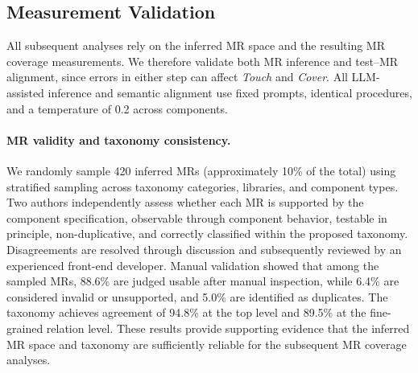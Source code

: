 \subsection{Measurement Validation}\label{sec:validation}
All subsequent analyses rely on the inferred MR space and the resulting MR coverage measurements. We therefore validate both MR inference and test--MR alignment, since errors in either step can affect \textit{Touch} and \textit{Cover}. All LLM-assisted inference and semantic alignment use fixed prompts, identical procedures, and a temperature of 0.2 across components.

\paragraph{MR validity and taxonomy consistency.}
We randomly sample 420 inferred MRs (approximately 10\% of the total) using stratified sampling across taxonomy categories, libraries, and component types. Two authors independently assess whether each MR is supported by the component specification, observable through component behavior, testable in principle, non-duplicative, and correctly classified within the proposed taxonomy. Disagreements are resolved through discussion and subsequently reviewed by an experienced front-end developer. 
Manual validation showed that among the sampled MRs, 88.6\% are judged usable after manual inspection, while 6.4\% are considered invalid or unsupported, and 5.0\% are identified as duplicates. The taxonomy achieves agreement of 94.8\% at the top level and 89.5\% at the fine-grained relation level. These results provide supporting evidence that the inferred MR space and taxonomy are sufficiently reliable for the subsequent MR coverage analyses.



